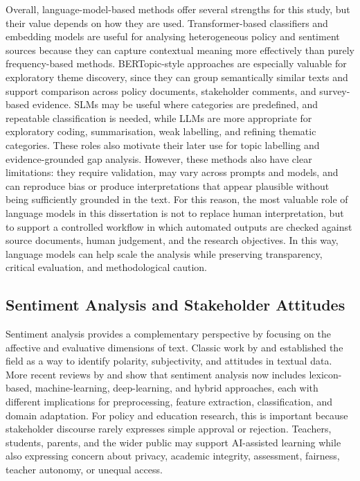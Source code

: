 Overall, language-model-based methods offer several strengths for this study, but
their value depends on how they are used. Transformer-based classifiers and embedding
models are useful for analysing heterogeneous policy and sentiment sources because
they can capture contextual meaning more effectively than purely frequency-based
methods. BERTopic-style approaches are especially valuable for exploratory theme
discovery, since they can group semantically similar texts and support comparison
across policy documents, stakeholder comments, and survey-based evidence. SLMs may be
useful where categories are predefined, and repeatable classification is needed,
while LLMs are more appropriate for exploratory coding, summarisation, weak
labelling, and refining thematic categories. These roles also motivate their later
use for topic labelling and evidence-grounded gap analysis. However, these methods
also have clear limitations: they require validation, may vary across prompts and
models, and can reproduce bias or produce interpretations that appear plausible
without being sufficiently grounded in the text. For this reason, the most valuable
role of language models in this dissertation is not to replace human interpretation,
but to support a controlled workflow in which automated outputs are checked against
source documents, human judgement, and the research objectives. In this way, language
models can help scale the analysis while preserving transparency, critical
evaluation, and methodological caution.


\subsection{Sentiment Analysis and Stakeholder Attitudes}

Sentiment analysis provides a complementary perspective by focusing on the affective
and evaluative dimensions of text. Classic work by \cite{pang2008opinion} and
\cite{liu2012sentiment} established the field as a way to identify polarity,
subjectivity, and attitudes in textual data. More recent reviews by
\cite{tan2023survey} and \cite{mao2024sentiment} show that sentiment analysis now
includes lexicon-based, machine-learning, deep-learning, and hybrid approaches, each
with different implications for preprocessing, feature extraction, classification,
and domain adaptation. For policy and education research, this is important because
stakeholder discourse rarely expresses simple approval or rejection. Teachers,
students, parents, and the wider public may support AI-assisted learning while also
expressing concern about privacy, academic integrity, assessment, fairness, teacher
autonomy, or unequal access.

